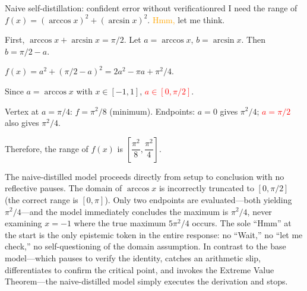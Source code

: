 \documentclass[11pt]{article}
\begin{document}
\begin{caseblock}{Naive self-distillation: confident error without verification}{red}
I need the range of \(f(x) = (\arccos x)^2 + (\arcsin x)^2\).
\textcolor{orange}{Hmm,} let me think.

First, \(\arccos x + \arcsin x = \pi/2\). Let \(a = \arccos x\), \(b = \arcsin x\). Then \(b = \pi/2 - a\).

\(f(x) = a^2 + (\pi/2 - a)^2 = 2a^2 - \pi a + \pi^2/4\).

Since \(a = \arccos x\) with \(x \in [-1,1]\), \textcolor{red}{\(a \in [0, \pi/2]\)}.

Vertex at \(a = \pi/4\): \(f = \pi^2/8\) (minimum).
Endpoints: \(a=0\) gives \(\pi^2/4\); \textcolor{red}{\(a=\pi/2\)} also gives \(\pi^2/4\).

Therefore, the range of \(f(x)\) is \(\boxed{\left[ \dfrac{\pi^2}{8}, \dfrac{\pi^2}{4} \right]}\).
\end{caseblock}
\begin{casenote}[Analysis]
The naive-distilled model proceeds directly from setup to conclusion with no reflective pauses. The domain of \(\arccos x\) is incorrectly truncated to \([0, \pi/2]\) (the correct range is \([0, \pi]\)). Only two endpoints are evaluated---both yielding \(\pi^2/4\)---and the model immediately concludes the maximum is \(\pi^2/4\), never examining \(x = -1\) where the true maximum \(5\pi^2/4\) occurs. The sole ``Hmm'' at the start is the only epistemic token in the entire response: no ``Wait,'' no ``let me check,'' no self-questioning of the domain assumption. In contrast to the base model---which pauses to verify the identity, catches an arithmetic slip, differentiates to confirm the critical point, and invokes the Extreme Value Theorem---the naive-distilled model simply executes the derivation and stops.
\end{casenote}
\end{document}
